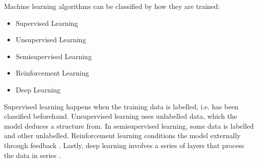 \documentclass[a4paper,11pt]{article}
\begin{document}
Machine learning algorithms can be classified by how they are trained:

\begin{itemize}
 \item Supervised Learning
 \item Unsupervised Learning
 \item Semisupervised Learning
 \item Reinforcement Learning
 \item Deep Learning
\end{itemize}

Supervised learning happens when the training data is labelled,
i.e. has been classified beforehand.
Unsupervised learning uses unlabelled data, which the model deduces a structure from.
In semisupervised learning, some data is labelled and other unlabelled.
Reinforcement learning conditions the model externally through feedback
\parencite[11]{Ibrahim2021}.
Lastly, deep learning involves a series of layers that process the data in series \parencite[13]{Ibrahim2021}.
\end{document}

